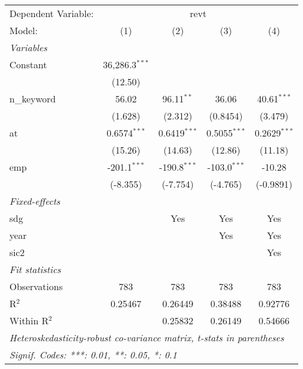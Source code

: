
\begingroup
\centering
\begin{tabular}{lcccc}
   \tabularnewline \midrule \midrule
   Dependent Variable: & \multicolumn{4}{c}{revt}\\
   Model:       & (1)              & (2)            & (3)            & (4)\\  
   \midrule
   \emph{Variables}\\
   Constant     & 36,286.3$^{***}$ &                &                &   \\   
                & (12.50)          &                &                &   \\   
   n\_keyword   & 56.02            & 96.11$^{**}$   & 36.06          & 40.61$^{***}$\\   
                & (1.628)          & (2.312)        & (0.8454)       & (3.479)\\   
   at           & 0.6574$^{***}$   & 0.6419$^{***}$ & 0.5055$^{***}$ & 0.2629$^{***}$\\   
                & (15.26)          & (14.63)        & (12.86)        & (11.18)\\   
   emp          & -201.1$^{***}$   & -190.8$^{***}$ & -103.0$^{***}$ & -10.28\\   
                & (-8.355)         & (-7.754)       & (-4.765)       & (-0.9891)\\   
   \midrule
   \emph{Fixed-effects}\\
   sdg          &                  & Yes            & Yes            & Yes\\  
   year         &                  &                & Yes            & Yes\\  
   sic2         &                  &                &                & Yes\\  
   \midrule
   \emph{Fit statistics}\\
   Observations & 783              & 783            & 783            & 783\\  
   R$^2$        & 0.25467          & 0.26449        & 0.38488        & 0.92776\\  
   Within R$^2$ &                  & 0.25832        & 0.26149        & 0.54666\\  
   \midrule \midrule
   \multicolumn{5}{l}{\emph{Heteroskedasticity-robust co-variance matrix, t-stats in parentheses}}\\
   \multicolumn{5}{l}{\emph{Signif. Codes: ***: 0.01, **: 0.05, *: 0.1}}\\
\end{tabular}
\par\endgroup


